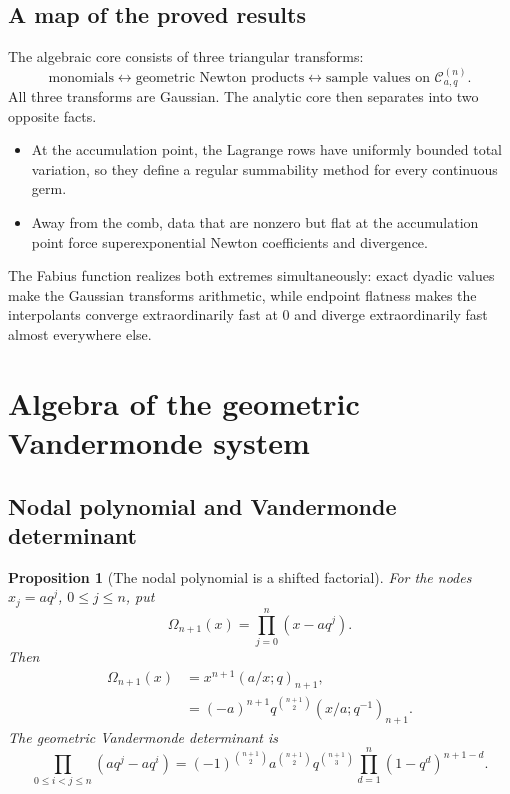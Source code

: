 \documentclass[11pt,a4paper,oneside]{article}
\newtheorem{proposition}[proposition]{Proposition}
\theoremstyle{definition}
\theoremstyle{remark}
\begin{document}
\subsection{A map of the proved results}

The algebraic core consists of three triangular transforms:
\[
 \text{monomials}
 \longleftrightarrow
 \text{geometric Newton products}
 \longleftrightarrow
 \text{sample values on }\mathcal C_{a,q}^{(n)}.
\]
All three transforms are Gaussian.  The analytic core then separates into two
opposite facts.

\begin{itemize}
\item At the accumulation point, the Lagrange rows have uniformly bounded
      total variation, so they define a regular summability method for every
      continuous germ.
\item Away from the comb, data that are nonzero but flat at the accumulation
      point force superexponential Newton coefficients and divergence.
\end{itemize}

The Fabius function realizes both extremes simultaneously: exact dyadic values
make the Gaussian transforms arithmetic, while endpoint flatness makes the
interpolants converge extraordinarily fast at $0$ and diverge extraordinarily
fast almost everywhere else.

\section{Algebra of the geometric Vandermonde system}
\label{sec:algebra}

\subsection{Nodal polynomial and Vandermonde determinant}

\begin{proposition}[The nodal polynomial is a shifted factorial]
\label{prop:nodal-polynomial}
For the nodes $x_j=aq^j$, $0\le j\le n$, put
\[
 \Omega_{n+1}(x)=\prod_{j=0}^n(x-aq^j).
\]
Then
\begin{align}
 \Omega_{n+1}(x)
 &=x^{n+1}(a/x;q)_{n+1},
 \label{eq:nodal-forward}\\
 &=(-a)^{n+1}q^{\binom{n+1}{2}}(x/a;q^{-1})_{n+1}.
 \label{eq:nodal-reversed}
\end{align}
The geometric Vandermonde determinant is
\begin{equation}
 \prod_{0\le i<j\le n}(aq^j-aq^i)
 =(-1)^{\binom{n+1}{2}}a^{\binom{n+1}{2}}
 q^{\binom{n+1}{3}}
 \prod_{d=1}^n(1-q^d)^{n+1-d}.
 \label{eq:geometric-vandermonde}
\end{equation}
\end{proposition}
\end{document}
